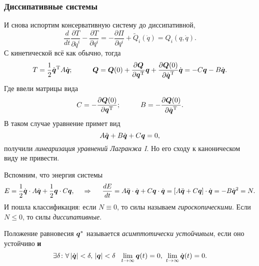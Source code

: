\subsubsection*{Диссипативные системы}

И снова испортим консервативную систему до диссипативной,
\begin{equation*}
    \frac{d }{d t} \frac{\partial T}{\partial \dot{q}^i} - \frac{\partial T}{\partial q^i} = - \frac{\partial \Pi}{\partial q^i} + \tilde Q_i(\dot{q}) = Q_i(q, \dot{q}).
\end{equation*}
С кинетической всё как обычно, тогда
\begin{equation*}
    T = \frac{1}{2} \dot{\mbox{\boldmath $q$}}^{\text{T}} A \dot{\mbox{\boldmath $q$}};
    \hspace{1 cm}
    \mbox{\boldmath $Q$} = \mbox{\boldmath $Q$}(0) + \frac{\partial \mbox{\boldmath $Q$}}{\partial \mbox{\boldmath $q$}^{\text{T}}} \mbox{\boldmath $q$} + \frac{\partial \mbox{\boldmath $Q$}(0)}{\partial \dot{\mbox{\boldmath $q$}}^{\text{T}}} \dot{\mbox{\boldmath $q$}} = - C \mbox{\boldmath $q$} - B \dot{\mbox{\boldmath $q$}}.
\end{equation*}
Где ввели матрицы вида
\begin{equation*}
    C = - \frac{\partial \mbox{\boldmath $Q$}(0)}{\partial \mbox{\boldmath $q$}^{\text{T}}};
    \hspace{1 cm}
    B = - \frac{\partial \mbox{\boldmath $Q$} (0)}{\partial \dot{\mbox{\boldmath $q$}}^{\text{T}}}.
\end{equation*}
В таком случае уравнение примет вид
\begin{equation}
    A \ddot{\mbox{\boldmath $q$}} + B \dot{\mbox{\boldmath $q$}} + C \mbox{\boldmath $q$} = 0,
\end{equation}
получили \textit{линеаризация уравнений Лагранжа I}.
Но его сходу к каноническом виду не привести.

Вспомним, что энергия системы
\begin{equation*}
    E = \frac{1}{2} \dot{\mbox{\boldmath $q$}} \cdot A \dot{\mbox{\boldmath $q$}} + \frac{1}{2} \mbox{\boldmath $q$} \cdot C \mbox{\boldmath $q$},
    \hspace{0.5cm} \Rightarrow \hspace{0.5cm}
    \frac{d E}{d t} = A \ddot{\mbox{\boldmath $q$}} \cdot \dot{\mbox{\boldmath $q$}} + C \mbox{\boldmath $q$} \cdot \dot{\mbox{\boldmath $q$}} =
    \left[
        A \ddot{\mbox{\boldmath $q$}} + C \mbox{\boldmath $q$}
    \right] \cdot \dot{\mbox{\boldmath $q$}} = - B \dot{\mbox{\boldmath $q$}}^2 = N.
\end{equation*}
И пошла классификация: если $N \equiv 0$, то силы называем \textit{гироскопическими}. Если $N \leq 0$, то силы \textit{диссипативные}. 


\begin{to_def}
    Положение равновесия $\mbox{\boldmath $q$}^*$ называется \textit{асимптотически устойчивым}, если оно устойчиво \textbf{и} 
    \begin{equation*}
        \exists \delta \colon  \forall\,  |\dot{\vc{q}}| < \delta, \, |\vc{q}| < \delta \ \ 
        \lim_{t \to \infty} \vc{q}(t) = 0, \ 
        \lim_{t \to \infty} \dot{\vc{q}}(t) = 0.
    \end{equation*}
\end{to_def}


